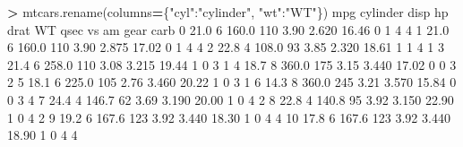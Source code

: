 \documentclass[
]{book}
\newenvironment{Shaded}{\begin{snugshade}}{\end{snugshade}}
\newcommand{\DecValTok}[1]{\textcolor[rgb]{0.00,0.00,0.81}{#1}}
\newcommand{\FloatTok}[1]{\textcolor[rgb]{0.00,0.00,0.81}{#1}}
\newcommand{\NormalTok}[1]{#1}
\newcommand{\OperatorTok}[1]{\textcolor[rgb]{0.81,0.36,0.00}{\textbf{#1}}}
\newcommand{\StringTok}[1]{\textcolor[rgb]{0.31,0.60,0.02}{#1}}
\begin{document}
\begin{Shaded}
\begin{Highlighting}[]
\OperatorTok{\textgreater{}}\NormalTok{ mtcars.rename(columns}\OperatorTok{=}\NormalTok{\{}\StringTok{"cyl"}\NormalTok{:}\StringTok{"cylinder"}\NormalTok{, }\StringTok{"wt"}\NormalTok{:}\StringTok{"WT"}\NormalTok{\})}
\NormalTok{     mpg  cylinder   disp   hp  drat     WT   qsec  vs  am  gear  carb}
\DecValTok{0}   \FloatTok{21.0}         \DecValTok{6}  \FloatTok{160.0}  \DecValTok{110}  \FloatTok{3.90}  \FloatTok{2.620}  \FloatTok{16.46}   \DecValTok{0}   \DecValTok{1}     \DecValTok{4}     \DecValTok{4}
\DecValTok{1}   \FloatTok{21.0}         \DecValTok{6}  \FloatTok{160.0}  \DecValTok{110}  \FloatTok{3.90}  \FloatTok{2.875}  \FloatTok{17.02}   \DecValTok{0}   \DecValTok{1}     \DecValTok{4}     \DecValTok{4}
\DecValTok{2}   \FloatTok{22.8}         \DecValTok{4}  \FloatTok{108.0}   \DecValTok{93}  \FloatTok{3.85}  \FloatTok{2.320}  \FloatTok{18.61}   \DecValTok{1}   \DecValTok{1}     \DecValTok{4}     \DecValTok{1}
\DecValTok{3}   \FloatTok{21.4}         \DecValTok{6}  \FloatTok{258.0}  \DecValTok{110}  \FloatTok{3.08}  \FloatTok{3.215}  \FloatTok{19.44}   \DecValTok{1}   \DecValTok{0}     \DecValTok{3}     \DecValTok{1}
\DecValTok{4}   \FloatTok{18.7}         \DecValTok{8}  \FloatTok{360.0}  \DecValTok{175}  \FloatTok{3.15}  \FloatTok{3.440}  \FloatTok{17.02}   \DecValTok{0}   \DecValTok{0}     \DecValTok{3}     \DecValTok{2}
\DecValTok{5}   \FloatTok{18.1}         \DecValTok{6}  \FloatTok{225.0}  \DecValTok{105}  \FloatTok{2.76}  \FloatTok{3.460}  \FloatTok{20.22}   \DecValTok{1}   \DecValTok{0}     \DecValTok{3}     \DecValTok{1}
\DecValTok{6}   \FloatTok{14.3}         \DecValTok{8}  \FloatTok{360.0}  \DecValTok{245}  \FloatTok{3.21}  \FloatTok{3.570}  \FloatTok{15.84}   \DecValTok{0}   \DecValTok{0}     \DecValTok{3}     \DecValTok{4}
\DecValTok{7}   \FloatTok{24.4}         \DecValTok{4}  \FloatTok{146.7}   \DecValTok{62}  \FloatTok{3.69}  \FloatTok{3.190}  \FloatTok{20.00}   \DecValTok{1}   \DecValTok{0}     \DecValTok{4}     \DecValTok{2}
\DecValTok{8}   \FloatTok{22.8}         \DecValTok{4}  \FloatTok{140.8}   \DecValTok{95}  \FloatTok{3.92}  \FloatTok{3.150}  \FloatTok{22.90}   \DecValTok{1}   \DecValTok{0}     \DecValTok{4}     \DecValTok{2}
\DecValTok{9}   \FloatTok{19.2}         \DecValTok{6}  \FloatTok{167.6}  \DecValTok{123}  \FloatTok{3.92}  \FloatTok{3.440}  \FloatTok{18.30}   \DecValTok{1}   \DecValTok{0}     \DecValTok{4}     \DecValTok{4}
\DecValTok{10}  \FloatTok{17.8}         \DecValTok{6}  \FloatTok{167.6}  \DecValTok{123}  \FloatTok{3.92}  \FloatTok{3.440}  \FloatTok{18.90}   \DecValTok{1}   \DecValTok{0}     \DecValTok{4}     \DecValTok{4}

\end{Highlighting}
\end{Shaded}
\end{document}
